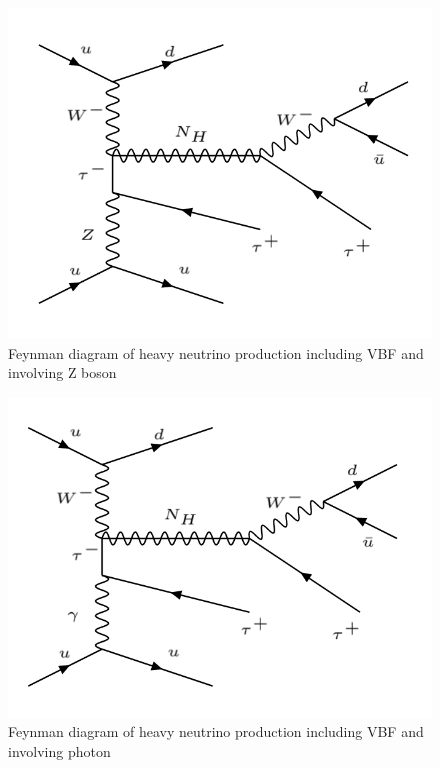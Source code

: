 \begin{figure}[H]
\centering
\includegraphics[scale = 0.45]{Figures/Feynman_hnZ}
\caption{Feynman diagram of heavy neutrino production including VBF and involving Z boson}
\label{fig: hnZ}
\end{figure}

\begin{figure}[H]
\centering
\includegraphics[scale = 0.45]{Figures/Feynman_hnGamma}
\caption{Feynman diagram of heavy neutrino production including VBF and involving photon}
\label{fig: hnGamma}
\end{figure}


